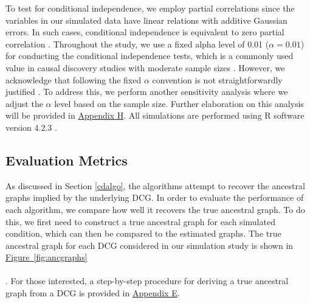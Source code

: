 \documentclass[twoside, 11pt]{article}
\newcommand*{\figref}[2][]{%
  \hyperref[{fig:#2}]{%
    Figure~\ref*{fig:#2}%
    \ifx\\#1\\%
    \else
      #1%
    \fi
  }%
}
\begin{document}
To test for conditional independence, we employ partial correlations since the variables in our simulated data have linear relations with additive Gaussian errors. In such cases, conditional independence is equivalent to zero partial correlation \citep{lawrance_conditional_1976}. Throughout the study, we use a fixed alpha level of 0.01 ($\alpha = 0.01$) for conducting the conditional independence tests, which is a commonly used value in causal discovery studies with moderate sample sizes \citep{malinsky_causal_2018}. However, we acknowledge that following the fixed $\alpha$ convention is not straightforwardly justified \citep{strobl_estimating_2017}. To address this, we perform another sensitivity analysis where we adjust the $\alpha$ level based on the sample size. Further elaboration on this analysis will be provided in \hyperref[varyingalpha]{Appendix H}. All simulations are performed using R software version 4.2.3 \citep{R}.



\subsection{Evaluation Metrics} \label{eval}
As discussed in Section \ref{cdalgo}, the algorithms attempt to recover the ancestral graphs implied by the underlying DCG. In order to evaluate the performance of each algorithm, we compare how well it recovers the true ancestral graph. To do this, we first need to construct a true ancestral graph for each simulated condition, which can then be compared to the estimated graphs. The true ancestral graph for each DCG considered in our simulation study is shown in \figref[]{ancgraphs}. For those interested, a step-by-step procedure for deriving a true ancestral graph from a DCG is provided in \hyperref[trueancestral]{Appendix E}.
\end{document}
